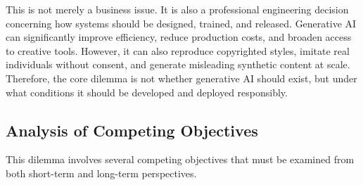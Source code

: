 This is not merely a business issue. It is also a professional engineering decision concerning how systems should be designed, trained, and released. Generative AI can significantly improve efficiency, reduce production costs, and broaden access to creative tools. However, it can also reproduce copyrighted styles, imitate real individuals without consent, and generate misleading synthetic content at scale. Therefore, the core dilemma is not whether generative AI should exist, but under what conditions it should be developed and deployed responsibly.

\subsection{Analysis of Competing Objectives}
This dilemma involves several competing objectives that must be examined from both short-term and long-term perspectives.

